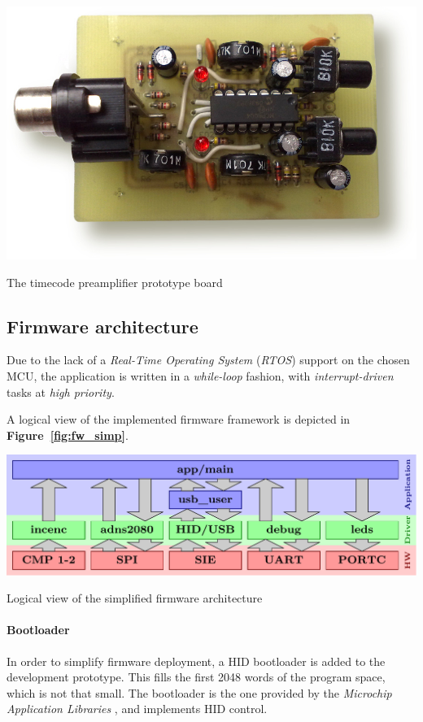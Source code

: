 \documentclass[a4paper,10pt]{article}
\makeatletter
\newenvironment{figurehere}{\def\@captype{figure}\vspace{2ex}}{\vspace{2ex}}
\newcommand{\citef}[1]{\textbf{Figure~\ref{#1}}}
\makeatother
\begin{document}
\begin{multicols}{2}
\begin{figurehere}
	\centering
	\includegraphics[keepaspectratio=true,width=\columnwidth]{images/preamp_photo.jpg}
	\caption{The timecode preamplifier prototype board}
	\label{fig:preamp_photo}
\end{figurehere}


\subsection{Firmware architecture}

Due to the lack of a \emph{Real-Time Operating System} (\emph{RTOS}) support
on the chosen MCU, the application is written in a \emph{while-loop} fashion,
with \emph{interrupt-driven} tasks at \emph{high priority}.

A logical view of the implemented firmware framework is depicted in
\citef{fig:fw_simp}.

\begin{figurehere}
	\centering
	\includegraphics[keepaspectratio=true,scale=0.4]{images/fw_simp.pdf}
	\caption{Logical view of the simplified firmware architecture}
	\label{fig:fw_simp}
\end{figurehere}


\paragraph{Bootloader}
In order to simplify firmware deployment, a HID bootloader is added to the
development prototype. This fills the first 2048 words of the program space,
which is not that small. The bootloader is the one provided by the
\emph{Microchip Application Libraries} \cite{microchip_mal}, and implements
HID control.


\end{multicols}
\end{document}
